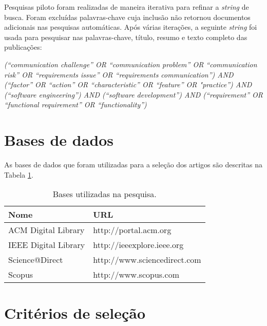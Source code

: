         Pesquisas piloto foram realizadas de maneira iterativa para refinar a \emph{string} de busca. Foram excluídas palavras-chave cuja inclusão não retornou documentos adicionais nas pesquisas automáticas. Após várias iterações, a seguinte \emph{string} foi usada para pesquisar nas palavras-chave, título, resumo e texto completo das publicações:

\emph{        
(“communication challenge” OR “communication problem” OR “communication
risk” OR “requirements issue” OR “requirements communication”) AND (“factor” OR “action”
OR “characteristic” OR “feature” OR "practice”) AND (“software engineering”) AND (“software
development”) AND (“requirement” OR “functional requirement” OR “functionality”)
}
\newpage

\section{Bases de dados}\label{sec:bases}

As bases de dados que foram utilizadas para a seleção dos artigos são descritas na Tabela \ref{tab:bases}.


\begin{table}[h]
\centering
\caption{Bases utilizadas na pesquisa.}
\begin{center}
\scriptsize
\label{base_de_pesquisa}
\begin{tabular}{p{5.0cm}p{5.0cm}}
\hline

\textbf{Nome}
&\textbf{URL}\\

\hline
ACM Digital Library &	http://portal.acm.org\\ 
IEEE Digital Library &	http://ieeexplore.ieee.org\\ 
Science@Direct &	http://www.sciencedirect.com \\	 
Scopus &	http://www.scopus.com \\
\hline
 
\end{tabular} 

\legend {\fontsize{10}{12}\selectfont {Fonte: Autor.}}
\end{center}
\label{tab:bases}
\end{table}


       \section{Critérios de seleção}
        \label{sec:criterios}
        
